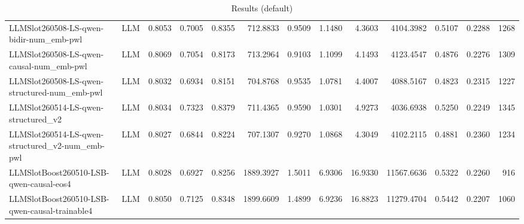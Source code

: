 \begin{table}[htbp]
{\begin{tabular}{ll|rrrrrrrrrr|r}
LLMSlot260508-LS-qwen-bidir-num\_emb-pwl & LLM & 0.8053 & 0.7005 & 0.8355 & 712.8833 & 0.9509 & 1.1480 & 4.3603 & 4104.3982 & 0.5107 & 0.2288 & 1268 \\
LLMSlot260508-LS-qwen-causal-num\_emb-pwl & LLM & 0.8069 & 0.7054 & 0.8173 & 713.2964 & 0.9103 & 1.1099 & 4.1493 & 4123.4547 & 0.4876 & 0.2276 & 1309 \\
LLMSlot260508-LS-qwen-structured-num\_emb-pwl & LLM & 0.8032 & 0.6934 & 0.8151 & 704.8768 & 0.9535 & 1.0781 & 4.4007 & 4088.5167 & 0.4823 & 0.2315 & 1227 \\
LLMSlot260514-LS-qwen-structured\_v2 & LLM & 0.8034 & 0.7323 & 0.8379 & 711.4365 & 0.9590 & 1.0301 & 4.9273 & 4036.6938 & 0.5250 & 0.2249 & 1345 \\
LLMSlot260514-LS-qwen-structured\_v2-num\_emb-pwl & LLM & 0.8027 & 0.6844 & 0.8224 & 707.1307 & 0.9270 & 1.0868 & 4.3049 & 4102.2115 & 0.4881 & 0.2360 & 1234 \\
LLMSlotBoost260510-LSB-qwen-causal-eos4 & LLM & 0.8028 & 0.6927 & 0.8256 & 1889.3927 & 1.5011 & 6.9306 & 16.9330 & 11567.6636 & 0.5322 & 0.2260 & 916 \\
LLMSlotBoost260510-LSB-qwen-causal-trainable4 & LLM & 0.8050 & 0.7125 & 0.8348 & 1899.6609 & 1.4899 & 6.9236 & 16.8823 & 11279.4704 & 0.5442 & 0.2207 & 1060 \\
\bottomrule
\end{tabular}
}
\caption{Results (default)}
\label{tab:results_default}
\end{table}